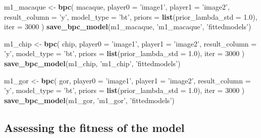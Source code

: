\documentclass[
]{book}
\newenvironment{Shaded}{\begin{snugshade}}{\end{snugshade}}
\newcommand{\DataTypeTok}[1]{\textcolor[rgb]{0.13,0.29,0.53}{#1}}
\newcommand{\DecValTok}[1]{\textcolor[rgb]{0.00,0.00,0.81}{#1}}
\newcommand{\FloatTok}[1]{\textcolor[rgb]{0.00,0.00,0.81}{#1}}
\newcommand{\KeywordTok}[1]{\textcolor[rgb]{0.13,0.29,0.53}{\textbf{#1}}}
\newcommand{\NormalTok}[1]{#1}
\newcommand{\StringTok}[1]{\textcolor[rgb]{0.31,0.60,0.02}{#1}}
\begin{document}
\begin{Shaded}
\begin{Highlighting}[]
\NormalTok{m1_macaque <-}
\StringTok{  }\KeywordTok{bpc}\NormalTok{(}
\NormalTok{    macaque,}
    \DataTypeTok{player0 =} \StringTok{'image1'}\NormalTok{,}
    \DataTypeTok{player1 =} \StringTok{'image2'}\NormalTok{,}
    \DataTypeTok{result_column =} \StringTok{'y'}\NormalTok{,}
    \DataTypeTok{model_type =} \StringTok{'bt'}\NormalTok{,}
    \DataTypeTok{priors =} \KeywordTok{list}\NormalTok{(}\DataTypeTok{prior_lambda_std =} \FloatTok{1.0}\NormalTok{),}
    \DataTypeTok{iter =} \DecValTok{3000}
\NormalTok{  )}
\KeywordTok{save_bpc_model}\NormalTok{(m1_macaque, }\StringTok{'m1_macaque'}\NormalTok{, }\StringTok{'fittedmodels'}\NormalTok{)}

\NormalTok{m1_chip <-}
\StringTok{  }\KeywordTok{bpc}\NormalTok{(}
\NormalTok{    chip,}
    \DataTypeTok{player0 =} \StringTok{'image1'}\NormalTok{,}
    \DataTypeTok{player1 =} \StringTok{'image2'}\NormalTok{,}
    \DataTypeTok{result_column =} \StringTok{'y'}\NormalTok{,}
    \DataTypeTok{model_type =} \StringTok{'bt'}\NormalTok{,}
    \DataTypeTok{priors =} \KeywordTok{list}\NormalTok{(}\DataTypeTok{prior_lambda_std =} \FloatTok{1.0}\NormalTok{),}
    \DataTypeTok{iter =} \DecValTok{3000}
\NormalTok{  )}
\KeywordTok{save_bpc_model}\NormalTok{(m1_chip, }\StringTok{'m1_chip'}\NormalTok{, }\StringTok{'fittedmodels'}\NormalTok{)}

\NormalTok{m1_gor <-}
\StringTok{  }\KeywordTok{bpc}\NormalTok{(}
\NormalTok{    gor,}
    \DataTypeTok{player0 =} \StringTok{'image1'}\NormalTok{,}
    \DataTypeTok{player1 =} \StringTok{'image2'}\NormalTok{,}
    \DataTypeTok{result_column =} \StringTok{'y'}\NormalTok{,}
    \DataTypeTok{model_type =} \StringTok{'bt'}\NormalTok{,}
    \DataTypeTok{priors =} \KeywordTok{list}\NormalTok{(}\DataTypeTok{prior_lambda_std =} \FloatTok{1.0}\NormalTok{),}
    \DataTypeTok{iter =} \DecValTok{3000}
\NormalTok{  )}
\KeywordTok{save_bpc_model}\NormalTok{(m1_gor, }\StringTok{'m1_gor'}\NormalTok{, }\StringTok{'fittedmodels'}\NormalTok{)}
\end{Highlighting}
\end{Shaded}

\hypertarget{assessing-the-fitness-of-the-model}{%
\subsection{Assessing the fitness of the model}\label{assessing-the-fitness-of-the-model}}
\end{document}
